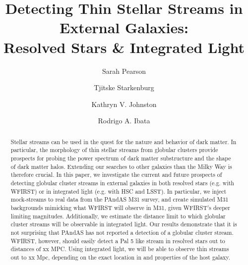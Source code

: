 \documentclass[twocolumn]{aastex62}
\begin{document}
\sloppy\sloppypar\raggedbottom\frenchspacing %
\title{Detecting Thin Stellar Streams in External Galaxies:\\ Resolved Stars \& Integrated Light}


 \author{Sarah Pearson}

\author{Tjitske Starkenburg}

\author{Kathryn V. Johnston}

\author{Rodrigo A. Ibata}

\begin{abstract}\noindent 
Stellar streams can  be used in the quest for the nature and behavior of dark matter. In particular, the morphology of thin stellar streams from globular clusters provide prospects for probing the power spectrum of dark matter substructure and the shape of dark matter halos.
Extending our searches to other galaxies than the Milky Way is therefore crucial.
In this paper, we investigate the current and future prospects of detecting globular cluster streams in external galaxies in both resolved stars (e.g. with WFIRST) or in integrated light (e.g. with HSC and LSST). In particular, we inject mock-streams to real data from the PAndAS M31 survey, and create simulated M31 backgrounds mimicking what WFIRST will observe in M31, given WFIRST's deeper limiting magnitudes. Additionally, we estimate the distance limit to which globular cluster streams will be observable in integrated light.  Our results demonstrate that it is not surprising that PAndAS has not reported a detection of a globular cluster stream. WFIRST, however, should easily detect a Pal 5 like stream in resolved stars out to distances of xx MPC. Using integrated light, we will be able to observe thin streams out to xx Mpc, depending on the exact location in and properties of the host galaxy. 

\end{abstract}
\end{document}
